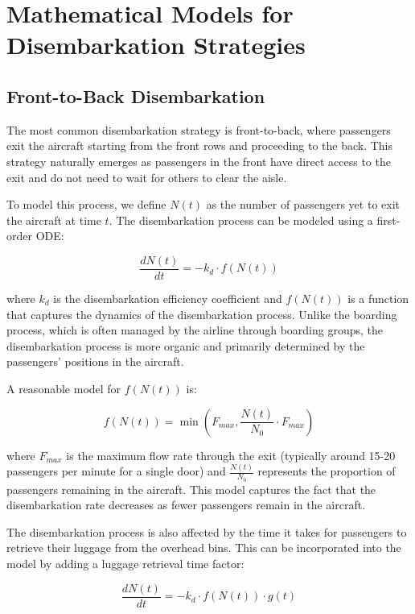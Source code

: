 \section{Mathematical Models for Disembarkation Strategies}
\subsection{Front-to-Back Disembarkation}

The most common disembarkation strategy is front-to-back, where passengers exit the aircraft starting from the front rows and proceeding to the back. This strategy naturally emerges as passengers in the front have direct access to the exit and do not need to wait for others to clear the aisle.

To model this process, we define $N(t)$ as the number of passengers yet to exit the aircraft at time $t$. The disembarkation process can be modeled using a first-order ODE:

\begin{equation}
\frac{dN(t)}{dt} = -k_d \cdot f(N(t))
\label{eq:front_to_back}
\end{equation}

where $k_d$ is the disembarkation efficiency coefficient and $f(N(t))$ is a function that captures the dynamics of the disembarkation process. Unlike the boarding process, which is often managed by the airline through boarding groups, the disembarkation process is more organic and primarily determined by the passengers' positions in the aircraft.

A reasonable model for $f(N(t))$ is:

\begin{equation}
f(N(t)) = \min\left(F_{max}, \frac{N(t)}{N_0} \cdot F_{max}\right)
\label{eq:disembarkation_rate}
\end{equation}

where $F_{max}$ is the maximum flow rate through the exit (typically around 15-20 passengers per minute for a single door) and $\frac{N(t)}{N_0}$ represents the proportion of passengers remaining in the aircraft. This model captures the fact that the disembarkation rate decreases as fewer passengers remain in the aircraft.

The disembarkation process is also affected by the time it takes for passengers to retrieve their luggage from the overhead bins. This can be incorporated into the model by adding a luggage retrieval time factor:

\begin{equation}
\frac{dN(t)}{dt} = -k_d \cdot f(N(t)) \cdot g(t)
\label{eq:luggage_retrieval}
\end{equation}

